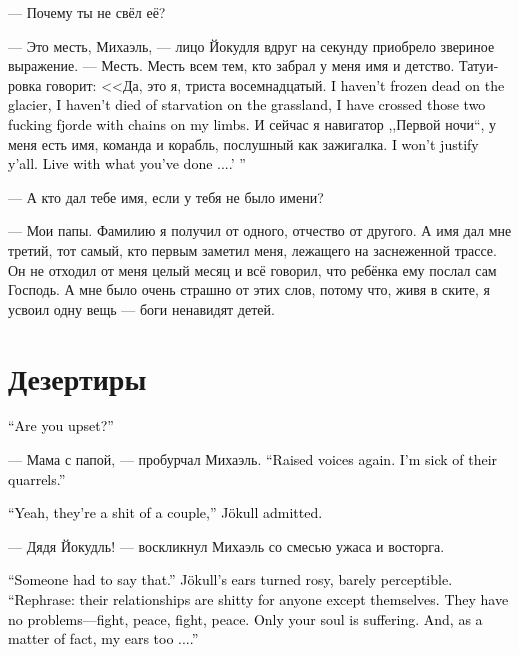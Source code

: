 \documentclass[a4paper,12pt,fleqn]{book}\usepackage{cooltooltips}\usepackage{polyglossia}\setdefaultlanguage[babelshorthands=true]{russian}\setotherlanguage{english}\defaultfontfeatures{Ligatures=TeX,Mapping=tex-text} \usepackage{xcolor}\definecolor{lightgray}{HTML}{bbbbbb}\color{lightgray}\newcommand{\ml}[3]{\textenglish{\textcolor{black}{#3}}}
\begin{document}
--- Почему ты не свёл её?

--- Это месть, Михаэль, --- лицо Йокудля вдруг на секунду приобрело звериное выражение.
--- Месть.
Месть всем тем, кто забрал у меня имя и детство.
Татуировка говорит: <<Да, это я, триста восемнадцатый.
\ml{$0$}
{Я не умер от холода на леднике, я не сдох от голода в степи, я переплыл те два гребаных фьорда, скованный цепями по рукам и ногам.}
{I haven't frozen dead on the glacier, I haven't died of starvation on the grassland, I have crossed those two fucking fjorde with chains on my limbs.}
И сейчас я навигатор ,,Первой ночи``, у меня есть имя, команда и корабль, послушный как зажигалка.
\ml{$0$}
{Я не буду вас оправдывать.}
{I won't justify y'all.}
\ml{$0$}
{Живите с тем, что вы сделали...>>}
{Live with what you've done ....' ''}

--- А кто дал тебе имя, если у тебя не было имени?

--- Мои папы.
Фамилию я получил от одного, отчество от другого.
А имя дал мне третий, тот самый, кто первым заметил меня, лежащего на заснеженной трассе.
Он не отходил от меня целый месяц и всё говорил, что ребёнка ему послал сам Господь.
А мне было очень страшно от этих слов, потому что, живя в ските, я усвоил одну вещь --- боги ненавидят детей.

\section{Дезертиры}

\ml{$0$}
{--- Ты чем-то опечален?}
{``Are you upset?''}

--- Мама с папой, --- пробурчал Михаэль.
\ml{$0$}
{--- Опять разговор на повышенных тонах.}
{``Raised voices again.}
\ml{$0$}
{Терпеть не могу эти их скандалы.}
{I'm sick of their quarrels.''}

\ml{$0$}
{--- Да, пара из них дерьмовая, --- признал Йокудль.}
{``Yeah, they're a shit of a couple,'' Jökull admitted.}

--- Дядя Йокудль! --- воскликнул Михаэль со смесью ужаса и восторга.

\ml{$0$}
{--- Кто-то должен был это сказать вслух, --- уши Йокудля едва заметно порозовели.}
{``Someone had to say that.'' Jökull's ears turned rosy, barely perceptible.}
\ml{$0$}
{--- Вернее, дерьмовая она для всех, кроме них.}
{``Rephrase: their relationships are shitty for anyone except themselves.}
\ml{$0$}
{Им хорошо --- поругались, помирились, поругались, помирились.}
{They have no problems---fight, peace, fight, peace.}
\ml{$0$}
{Страдает только твоя душа.}
{Only your soul is suffering.}
\ml{$0$}
{И мои уши, если честно, тоже...}
{And, as a matter of fact, my ears too ....''}
\end{document}
